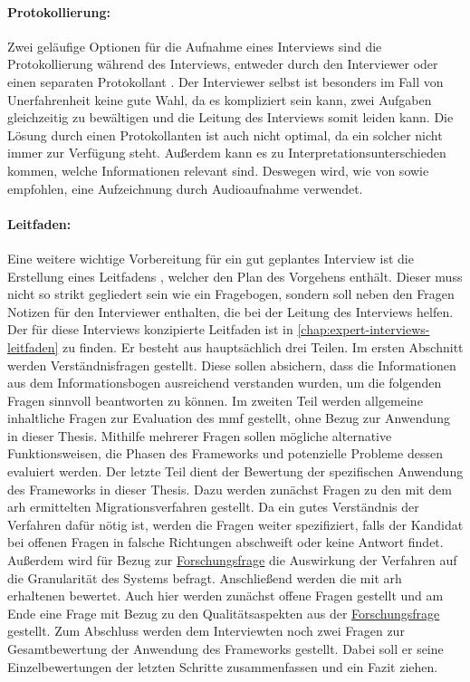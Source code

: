 \paragraph{Protokollierung:} Zwei geläufige Optionen für die Aufnahme eines Interviews sind die Pro\-to\-kol\-lie\-rung während des Interviews, entweder durch den Interviewer oder einen separaten Protokollant \cite{seaman2008qualitative,Runeson2009}.
Der Interviewer selbst ist besonders im Fall von Unerfahrenheit keine gute Wahl, da es kompliziert sein kann, zwei Aufgaben gleichzeitig zu bewältigen und die Leitung des Interviews somit leiden kann.
Die Lösung durch einen Protokollanten ist auch nicht optimal, da ein solcher nicht immer zur Verfügung steht.
Außerdem kann es zu Interpretationsunterschieden kommen, welche Informationen relevant sind.
Deswegen wird, wie von  sowie  empfohlen, eine Aufzeichnung durch Audioaufnahme verwendet.

\paragraph{Leitfaden:} Eine weitere wichtige Vorbereitung für ein gut geplantes Interview ist die Erstellung eines Leitfadens \cite{seaman2008qualitative,hove-anda-2005}, welcher den Plan des Vorgehens enthält.
Dieser muss nicht so strikt gegliedert sein wie ein Fragebogen, sondern soll neben den Fragen Notizen für den Interviewer enthalten, die bei der Leitung des Interviews helfen.
Der für diese Interviews konzipierte Leitfaden ist in \cref{chap:expert-interviews-leitfaden} zu finden.
Er besteht aus hauptsächlich drei Teilen.
Im ersten Abschnitt werden Verständnisfragen gestellt.
Diese sollen absichern, dass die Informationen aus dem Informationsbogen ausreichend verstanden wurden, um die folgenden Fragen sinnvoll beantworten zu können.
Im zweiten Teil werden allgemeine inhaltliche Fragen zur Evaluation des \gls{mmf} gestellt, ohne Bezug zur Anwendung in dieser Thesis.
Mithilfe mehrerer Fragen sollen mögliche alternative Funktionsweisen, die Phasen des Frameworks und potenzielle Probleme dessen evaluiert werden.
Der letzte Teil dient der Bewertung der spezifischen Anwendung des Frameworks in dieser Thesis.
Dazu werden zunächst Fragen zu den mit dem \gls{arh} ermittelten Migrationsverfahren gestellt.
Da ein gutes Verständnis der Verfahren dafür nötig ist, werden die Fragen weiter spezifiziert, falls der Kandidat bei offenen Fragen in falsche Richtungen abschweift oder keine Antwort findet.
Außerdem wird für Bezug zur \hyperref[forschungsfrage:1]{Forschungsfrage} die Auswirkung der Verfahren auf die Granularität des Systems befragt.
Anschließend werden die mit \gls{arh} erhaltenen \bpp bewertet.
Auch hier werden zunächst offene Fragen gestellt und am Ende eine Frage mit Bezug zu den Qualitätsaspekten aus der \hyperref[forschungsfrage:1]{Forschungsfrage} gestellt.
Zum Abschluss werden dem Interviewten noch zwei Fragen zur Gesamtbewertung der Anwendung des Frameworks gestellt.
Dabei soll er seine Einzelbewertungen der letzten Schritte zusammenfassen und ein Fazit ziehen.


